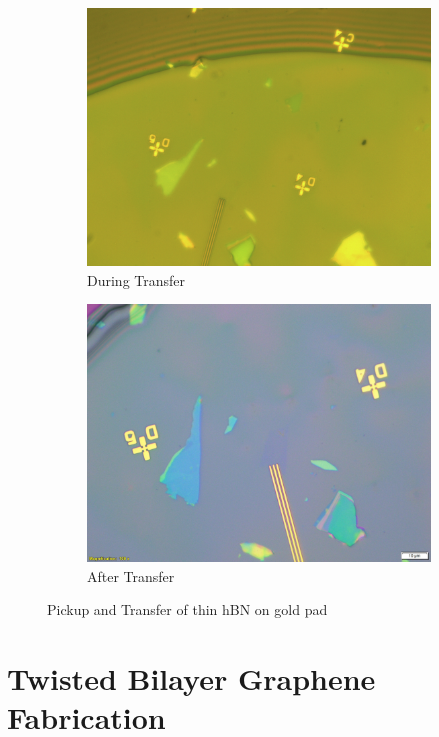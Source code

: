 \begin{figure}[H]
\begin{subfigure}[b]{0.4\textwidth}
         \includegraphics[width=\textwidth]{figures/during_transfer.jpg}
         \caption{During Transfer}
     \end{subfigure}
     \qquad
     \begin{subfigure}[b]{0.4\textwidth}
         \centering
         \includegraphics[width=\textwidth]{figures/after_transfer.jpg}
         \caption{After Transfer}
     \end{subfigure}
        \label{fig:hbnongoldpad}
    \caption{Pickup and Transfer of thin hBN on gold pad}
\end{figure}

\section{Twisted Bilayer Graphene Fabrication}

